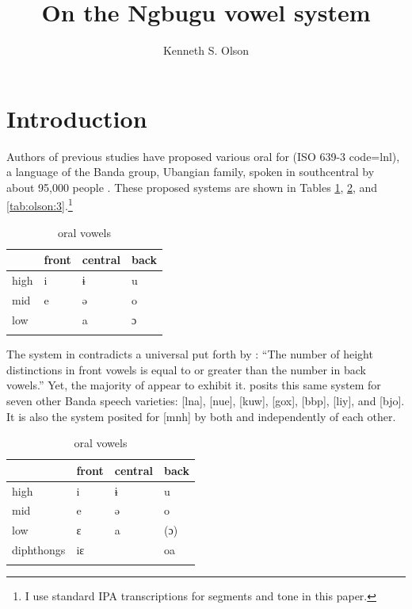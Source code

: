 \documentclass[output=paper,colorlinks,citecolor=brown]{langscibook}
\title{On the Ngbugu vowel system}
\author{Kenneth S. Olson\affiliation{SIL International}
}
\begin{document}
\maketitle

\section{Introduction}\label{sec:olson:1}

Authors of previous studies have proposed various oral  for  (ISO 639-3 code=lnl), a language of the Banda  group, Ubangian  family, spoken in southcentral  by about 95,000 people \citep{SimonsFennig2018}. These proposed systems are shown in Tables \ref{tab:olson:1}, \ref{tab:olson:2}, and \ref{tab:olson:3}.\footnote{I use standard IPA transcriptions for segments and tone in this paper.}

\begin{table}
\caption{ oral vowels \citep[13--14]{Cloarec-Heiss1978}}
\label{tab:olson:1}
    \begin{tabular}{llll}
    \lsptoprule
                & front & central & back\\
    \midrule
        high    & i     & ɨ       & u\\
        mid     & e     & ə       & o\\
        low     &       & a       & ɔ\\
    \lspbottomrule
    \end{tabular}
\end{table}

The system in  contradicts a universal  put forth by \citet[122]{Crothers1978}: “The number of height  distinctions in front vowels is equal to or greater than the number in back vowels.” Yet, the majority of  appear to exhibit it. \citet[13--16]{Cloarec-Heiss1978} posits this same system for seven other Banda  speech varieties:  [lna],  [nue],  [kuw],  [gox],  [bbp],  [liy], and  [bjo]. It is also the system posited for  [mnh] by both \citet{Kamanda-Kola2003} and \citet{Olson2005} independently of each other.

\begin{table}
\caption{ oral vowels \citep[43]{Théret-Kieschke1998}}
\label{tab:olson:2}
    \begin{tabular}{llll}
    \lsptoprule
                    & front & central & back\\
    \midrule
        high        & i     & ɨ       & u\\
        mid         & e     & ə       & o\\
        low         & ɛ     & a       & (ɔ)\\
        diphthongs  & iɛ    &         & oa\\
    \lspbottomrule
    \end{tabular}
\end{table}
\end{document}
